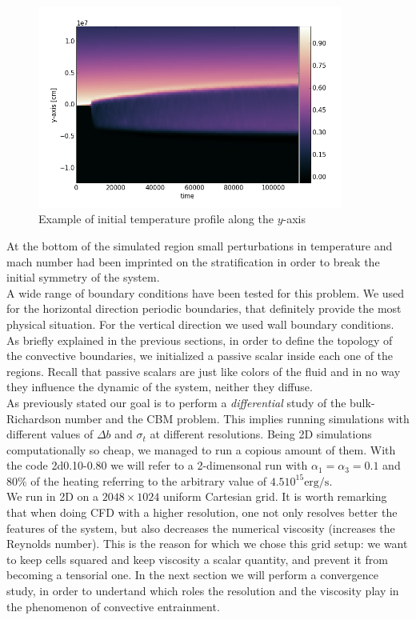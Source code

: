 \begin{figure}[t]
\centering
\includegraphics[width=10cm]{./img/tempprofile}
\caption{Example of initial temperature profile along the $y$-axis}
\label{fig:tempprofile}
\centering
\end{figure}
At the bottom of the simulated region small perturbations in temperature and mach number had been imprinted on the stratification in order to break the initial symmetry of the system.\\
A wide range of boundary conditions have been tested for this problem. We used for the horizontal direction periodic boundaries, that definitely provide the most physical situation. For the vertical direction we used wall boundary conditions.\\ 
As briefly explained in the previous sections, in order to define the topology of the convective boundaries, we initialized a passive scalar inside each one of the regions. Recall that passive scalars are just like colors of the fluid and in no way they influence the dynamic of the system, neither they diffuse.\\
As previously stated our goal is to perform a \textit{differential} study of the bulk-Richardson number and the CBM problem. This implies running simulations with different values of $\Delta b$ and $\sigma_t$ at different resolutions. Being 2D simulations computationally so cheap, we managed to run a copious amount of them. With the code 2d0.10-0.80 we will refer to a 2-dimensonal run with $\alpha_{1} = \alpha_{3}=0.1$ and $80 \%$ of the heating referring to the arbitrary value of $4.5 10^{15} \mathrm{erg/s}$.\\ 
We run in 2D on a $2048 \times 1024$ uniform Cartesian grid. It is worth remarking that when doing CFD with a higher resolution, one not only resolves better the features of the system, but also decreases the numerical viscosity (increases the Reynolds number). This is the reason for which we chose this grid setup: we want to keep cells squared and keep viscosity a scalar quantity, and prevent it from becoming a tensorial one. In the next section we will perform a convergence study, in order to undertand which roles the resolution and the viscosity play in the phenomenon of convective entrainment.\\ 

